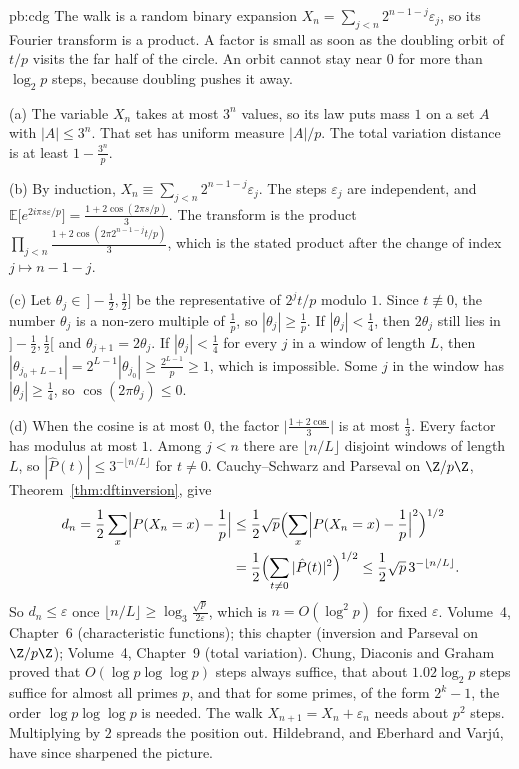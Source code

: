 \begin{solution}{pb:cdg}
\idea The walk is a random binary expansion $X_n=\sum_{j<n}2^{n-1-j}\varepsilon_j$, so its Fourier transform is a product. A factor is small as soon as the doubling orbit of $t/p$ visits the far half of the circle. An orbit cannot stay near $0$ for more than $\log_2 p$ steps, because doubling pushes it away.

\writeup (a) The variable $X_n$ takes at most $3^n$ values, so its law puts mass $1$ on a set $A$ with $|A|\le3^n$. That set has uniform measure $|A|/p$. The total variation distance is at least $1-\frac{3^n}p$.

(b) By induction, $X_n\equiv\sum_{j<n}2^{n-1-j}\varepsilon_j$. The steps $\varepsilon_j$ are independent, and $\mathbb E\bigl[e^{2i\pi s\varepsilon/p}\bigr]=\frac{1+2\cos(2\pi s/p)}3$. The transform is the product $\prod_{j<n}\frac{1+2\cos(2\pi 2^{n-1-j}t/p)}3$, which is the stated product after the change of index $j\mapsto n-1-j$.

(c) Let $\theta_j\in\,]-\frac12,\frac12]$ be the representative of $2^jt/p$ modulo $1$. Since $t\not\equiv0$, the number $\theta_j$ is a non-zero multiple of $\frac1p$, so $|\theta_j|\ge\frac1p$. If $|\theta_j|<\frac14$, then $2\theta_j$ still lies in $]-\frac12,\frac12[$ and $\theta_{j+1}=2\theta_j$. If $|\theta_j|<\frac14$ for every $j$ in a window of length $L$, then $|\theta_{j_0+L-1}|=2^{L-1}|\theta_{j_0}|\ge\frac{2^{L-1}}p\ge1$, which is impossible. Some $j$ in the window has $|\theta_j|\ge\frac14$, so $\cos(2\pi\theta_j)\le0$.

(d) When the cosine is at most $0$, the factor $\bigl|\frac{1+2\cos}3\bigr|$ is at most $\frac13$. Every factor has modulus at most $1$. Among $j<n$ there are $\lfloor n/L\rfloor$ disjoint windows of length $L$, so $|\hat P(t)|\le3^{-\lfloor n/L\rfloor}$ for $t\ne0$. Cauchy--Schwarz and Parseval on $\Z/p\Z$, Theorem~\ref{thm:dftinversion}, give
\[
\begin{aligned}d_n=\frac12\sum_x\Bigl|P(X_n=x)-\frac1p\Bigr|&\le\frac12\sqrt p\Bigl(\sum_x\Bigl|P(X_n=x)-\frac1p\Bigr|^2\Bigr)^{1/2}\\&=\frac12\Bigl(\sum_{t\ne0}|\hat P(t)|^2\Bigr)^{1/2}\le\frac12\sqrt p\,3^{-\lfloor n/L\rfloor}.\end{aligned}
\]
So $d_n\le\varepsilon$ once $\lfloor n/L\rfloor\ge\log_3\frac{\sqrt p}{2\varepsilon}$, which is $n=O(\log^2 p)$ for fixed $\varepsilon$.
\tools Volume~4, Chapter~6 (characteristic functions); this chapter (inversion and Parseval on $\Z/p\Z$); Volume~4, Chapter~9 (total variation).
\leads Chung, Diaconis and Graham proved that $O(\log p\log\log p)$ steps always suffice, that about $1.02\log_2 p$ steps suffice for almost all primes $p$, and that for some primes, of the form $2^k-1$, the order $\log p\log\log p$ is needed. The walk $X_{n+1}=X_n+\varepsilon_n$ needs about $p^2$ steps. Multiplying by $2$ spreads the position out. Hildebrand, and Eberhard and Varj\'u, have since sharpened the picture.
\end{solution}

